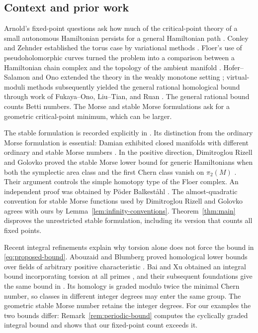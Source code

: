 \subsection*{Context and prior work}
Arnold's fixed-point questions ask how much of the critical-point theory of a small autonomous Hamiltonian persists for a general Hamiltonian path \cite{Arnold1986}. Conley and Zehnder established the torus case by variational methods \cite{ConleyZehnder1983}. Floer's use of pseudoholomorphic curves turned the problem into a comparison between a Hamiltonian chain complex and the topology of the ambient manifold \cite{Floer1989}. Hofer--Salamon and Ono extended the theory in the weakly monotone setting \cite{HoferSalamon1995,Ono1995}; virtual-moduli methods subsequently yielded the general rational homological bound through work of Fukaya--Ono, Liu--Tian, and Ruan \cite{FukayaOno1999,LiuTian1998,Ruan1999}. The general rational bound counts Betti numbers. The Morse and stable Morse formulations ask for a geometric critical-point minimum, which can be larger.

The stable formulation is recorded explicitly in \cite[Conjecture~1.2]{Golovko2020}. Its distinction from the ordinary Morse formulation is essential: Damian exhibited closed manifolds with different ordinary and stable Morse numbers \cite{Damian2002}. In the positive direction, Dimitroglou Rizell and Golovko proved the stable Morse lower bound for generic Hamiltonians when both the symplectic area class and the first Chern class vanish on $\pi_2(M)$ \cite[Corollary~1.4]{DRG2017}. Their argument controls the simple homotopy type of the Floer complex. An independent proof was obtained by P\"oder Balkest\aa hl \cite[Corollary~1.2]{PoderBalkestahl2021}. The almost-quadratic convention for stable Morse functions used by Dimitroglou Rizell and Golovko agrees with ours by Lemma~\ref{lem:infinity-conventions}. Theorem~\ref{thm:main} disproves the unrestricted stable formulation, including its version that counts all fixed points.

Recent integral refinements explain why torsion alone does not force the bound in \eqref{eq:proposed-bound}. Abouzaid and Blumberg proved homological lower bounds over fields of arbitrary positive characteristic \cite{AbouzaidBlumberg2021}. Bai and Xu obtained an integral bound incorporating torsion at all primes \cite[Theorem~A]{BaiXu2022}, and their subsequent foundations give the same bound in \cite[Corollary~1.2]{BaiXu2026}. Its homology is graded modulo twice the minimal Chern number, so classes in different integer degrees may enter the same group. The geometric stable Morse number retains the integer degrees. For our examples the two bounds differ: Remark~\ref{rem:periodic-bound} computes the cyclically graded integral bound and shows that our fixed-point count exceeds it.

